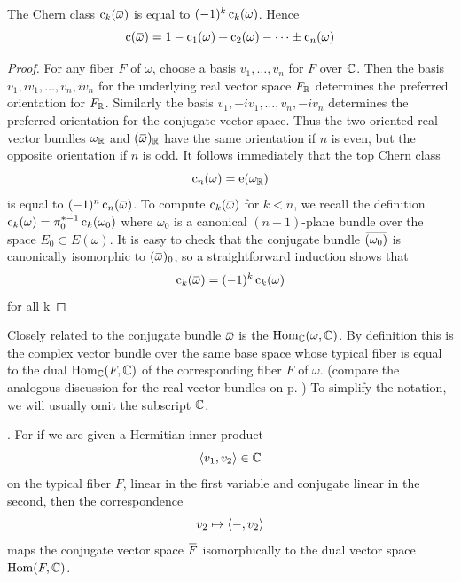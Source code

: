 \documentclass[../main]{subfiles}
\begin{document}
\begin{lemma}\label{lem:14.9}
The Chern class $\chernclass_k(\xoverline{\omega})$ is equal to $(-1)^k \operatorname{c}_k(\omega)$. Hence \[\chernclass(\xoverline{\omega}) = 1-\chernclass_1(\omega)+\chernclass_2(\omega)-\dots \pm \chernclass_n(\omega)\]
\end{lemma}
\begin{proof}
For any fiber $F$ of $\omega$, choose a basis $v_1,\dots,v_n$ for $F$ over $\mathbb C$. Then the basis $v_1,iv_1,\dots,v_n,iv_n$ for the underlying real vector space $F_\mathbb R$ determines the preferred orientation for $F_\mathbb R$. Similarly the basis $v_1,-iv_1,\dots,v_n,-iv_n$ determines the preferred orientation for the conjugate vector space. Thus the two oriented real vector bundles $\omega_\mathbb R$ and $(\xoverline{\omega})_\bR$ have the same orientation if $n$ is even, but the opposite orientation if $n$ is odd. It follows immediately that the top Chern class
\[\operatorname{c}_n (\omega)=\operatorname{e}(\omega_\mathbb R)\]
is equal to $(-1)^n\chernclass_n(\xoverline{\omega})$. To compute $\chernclass_k(\xoverline{\omega})$ for $k<n$, we recall the definition $\operatorname{c}_k(\omega)=\pi_0^{*-1} \operatorname{c}_k(\omega_0)$ where $\omega_0$ is a canonical $(n-1)$-plane bundle over the space $E_0\subset E(\omega)$. It is easy to check that the conjugate bundle $\xoverline{(\omega_0)}$ is canonically isomorphic to $(\xoverline{\omega})_0$, so a straightforward induction shows that
\[\chernclass_k(\xoverline{\omega}) = (-1)^k \chernclass_k(\omega)\]
for all k
\end{proof}

Closely related to the conjugate bundle $\xoverline{\omega}$ is the  $\operatorname{Hom}_\mathbb C(\omega,\mathbb C)$. By definition this is the complex vector bundle over the same base space whose typical fiber is equal to the dual $\operatorname{Hom}_\mathbb C(F,\mathbb C)$ of the corresponding fiber $F$ of $\omega$. (compare the analogous discussion for the real vector bundles on p. \pageref{functors on vectors}) To simplify the notation, we will usually omit the subscript $\mathbb C$. 

. For if we are given a Hermitian inner product
\[\langle v_1,v_2\rangle\in \mathbb C\]
on the typical fiber $F$, linear in the first variable and conjugate linear in the second, then the correspondence
\[v_2\mapsto \langle-,v_2\rangle\]
maps the conjugate vector space $\xoverline{F}$ isomorphically to the dual vector space $\operatorname{Hom}(F,\mathbb C)$.\newpage
\end{document}
